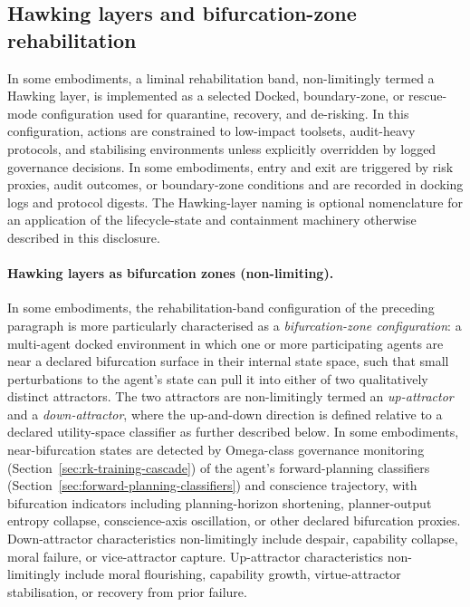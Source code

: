 \documentclass[a4paper,12pt]{article}
\begin{document}
\subsection{Hawking layers and bifurcation-zone rehabilitation}
\label{sec:hawking-layer}

In some embodiments, a liminal rehabilitation band, non-limitingly
termed a Hawking layer, is implemented as a selected Docked,
boundary-zone, or rescue-mode configuration used for quarantine,
recovery, and de-risking. In this configuration, actions are
constrained to low-impact toolsets, audit-heavy protocols, and
stabilising environments unless explicitly overridden by logged
governance decisions. In some embodiments, entry and exit are
triggered by risk proxies, audit outcomes, or boundary-zone
conditions and are recorded in docking logs and protocol digests.
The Hawking-layer naming is optional nomenclature for an
application of the lifecycle-state and containment machinery
otherwise described in this disclosure.

\paragraph{Hawking layers as bifurcation zones (non-limiting).}
In some embodiments, the rehabilitation-band configuration of the
preceding paragraph is more particularly characterised as a
\emph{bifurcation-zone configuration}: a multi-agent docked
environment in which one or more participating agents are near a
declared bifurcation surface in their internal state space, such that
small perturbations to the agent's state can pull it into either of
two qualitatively distinct attractors. The two attractors are
non-limitingly termed an \emph{up-attractor} and a
\emph{down-attractor}, where the up-and-down direction is defined
relative to a declared utility-space classifier as further described
below. In some embodiments, near-bifurcation states are detected by
Omega-class governance monitoring
(Section~\ref{sec:rk-training-cascade}) of the agent's
forward-planning classifiers
(Section~\ref{sec:forward-planning-classifiers}) and conscience
trajectory, with bifurcation indicators including planning-horizon
shortening, planner-output entropy collapse, conscience-axis
oscillation, or other declared bifurcation proxies. Down-attractor
characteristics non-limitingly include despair, capability collapse,
moral failure, or vice-attractor capture. Up-attractor characteristics
non-limitingly include moral flourishing, capability growth,
virtue-attractor stabilisation, or recovery from prior failure.
\end{document}
